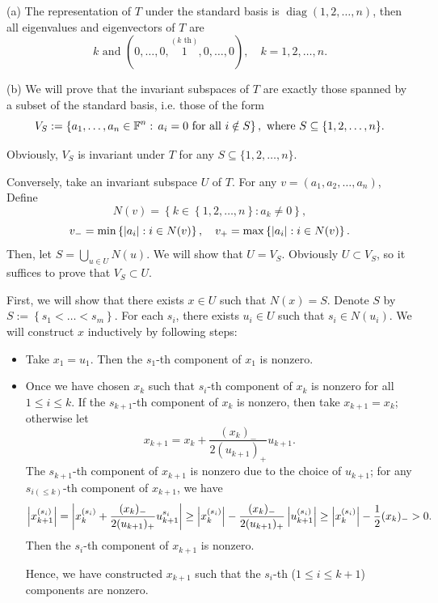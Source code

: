 \documentclass{article}
\begin{document}
\begin{solution}
  (a) The representation of \( T \) under the standard basis is \( \operatorname{diag}(1,2,\dots,n) \), then all eigenvalues and eigenvectors of \( T \) are
  \[ k\text{ and }(0,\dots,0,\overset{(k\text{ th})}{1},0,\dots,0), \quad k=1,2,\dots,n. \]\par
  (b) We will prove that the invariant subspaces of \( T \) are exactly those spanned by a subset of the standard basis, i.e. those of the form
  \[ V_S:=\left\{ a_1,\dots,a_n \in\mathbb{F}^n:\, a_i=0 \text{ for all } i\notin S \right\},\text{ where } S \subseteq \{1,2,\dots,n\}. \]\par
  Obviously, \( V_S \) is invariant under \( T \) for any \( S \subseteq \{1,2,\dots,n\} \). \par
  Conversely, take an invariant subspace \( U \) of \( T \). For any \( v=(a_1,a_2,\dots,a_n) \), Define 
  \[ N(v)=\left\{ k\in\left\{ 1,2,\dots,n \right\}:a_k\neq 0 \right\}, \]
  \[ v_-=\min\left\{ \left|a_i\right|:i\in N(v) \right\},\quad v_+=\max\left\{ \left|a_i\right|:i\in N(v) \right\}. \]
  Then, let \( S=\bigcup_{u\in U}^{}N(u) \). We will show that \( U=V_S \). Obviously \( U\subset V_S \), so it suffices to prove that \( V_S\subset U \).\par
  First, we will show that there exists \( x\in U \) such that \( N(x)=S \). Denote \( S \) by \( S:=\left\{ s_1<\dots<s_m \right\} \). For each \( s_i \), there exists \( u_i\in U \) such that \( s_i\in N(u_i) \). We will construct \( x \) inductively by following steps:
  \begin{itemize}
    \item Take \( x_1=u_1 \). Then the \( s_1 \)-th component of \( x_1 \) is nonzero.
    \item Once we have chosen \( x_k \) such that \( s_i \)-th component of \( x_k \) is nonzero for all \( 1\le i\le k \). If the \( s_{k+1} \)-th component of \( x_k \) is nonzero, then take \( x_{k+1}=x_k \); otherwise let
    \[ x_{k+1} = x_k + \frac{(x_{k})_-}{2(u_{k+1})_+} u_{k+1}. \]
    The \( s_{k+1} \)-th component of \( x_{k+1} \) is nonzero due to the choice of \( u_{k+1} \); for any \( s_{i(\le k)} \)-th component of \( x_{k+1} \), we have
    \[ \left|x_{k+1}^{(s_i)}\right|
    =\left|x_{k}^{(s_i)}+\frac{(x_{k})_-}{2(u_{k+1})_+}u_{k+1}^{s_i}\right|
    \ge \left|x_{k}^{(s_i)}\right|-\frac{(x_{k})_-}{2(u_{k+1})_+}\left|u_{k+1}^{(s_i)}\right|
    \ge \left|x_{k}^{(s_i)}\right|-\frac{1}{2}(x_k)_->0. \]
    Then the \( s_i \)-th component of \( x_{k+1} \) is nonzero. \par
    Hence, we have constructed \( x_{k+1} \) such that the \( s_i \)-th (\( 1\le i\le k+1 \)) components are nonzero.

\end{itemize}
\end{solution}
\end{document}
